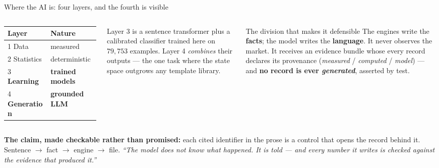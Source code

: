 \documentclass[aspectratio=169]{beamer}
\begin{document}
\begin{frame}{Where the AI is: four layers, and the fourth is visible}
\begin{columns}[T]
\small
\begin{tabular}{@{}ll@{}}
\toprule
\textbf{Layer} & \textbf{Nature} \\
\midrule
1 Data & measured \\
2 Statistics & deterministic \\
3 \textbf{Learning} & \textbf{trained models} \\
4 \textbf{Generation} & \textbf{grounded LLM} \\
\bottomrule
\end{tabular}
\medskip

{\footnotesize Layer 3 is a sentence transformer plus a calibrated classifier trained here on
$79{,}753$ examples. Layer 4 \emph{combines} their outputs --- the one task where the state space
outgrows any template library.}

\begin{block}{\small The division that makes it defensible}
\small The engines write the \textbf{facts}; the model writes the \textbf{language}. It never
observes the market. It receives an evidence bundle whose every record declares its provenance
(\emph{measured} / \emph{computed} / \emph{model}) --- and \textbf{no record is ever
\emph{generated}}, asserted by test.
\end{block}
\end{columns}
\vfill
{\footnotesize\textbf{The claim, made checkable rather than promised:} each cited identifier in
the prose is a control that opens the record behind it. Sentence $\to$ fact $\to$ engine $\to$
file. \emph{``The model does not know what happened. It is told --- and every number it writes is
checked against the evidence that produced it.''}}
\end{frame}
\end{document}
